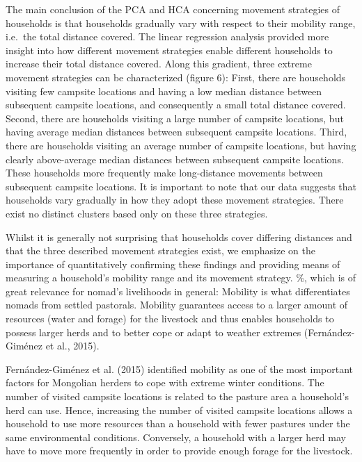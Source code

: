 \documentclass[]{elsarticle} %
\begin{document}
The main conclusion of the PCA and HCA concerning movement strategies of
households is that households gradually vary with respect to their
mobility range, i.e.~the total distance covered. The linear regression
analysis provided more insight into how different movement strategies
enable different households to increase their total distance covered.
Along this gradient, three extreme movement strategies can be
characterized (figure 6): First, there are households visiting few
campsite locations and having a low median distance between subsequent
campsite locations, and consequently a small total distance covered.
Second, there are households visiting a large number of campsite
locations, but having average median distances between subsequent
campsite locations. Third, there are households visiting an average
number of campsite locations, but having clearly above-average median
distances between subsequent campsite locations. These households more
frequently make long-distance movements between subsequent campsite
locations. It is important to note that our data suggests that
households vary gradually in how they adopt these movement strategies.
There exist no distinct clusters based only on these three strategies.

Whilst it is generally not surprising that households cover differing
distances and that the three described movement strategies exist, we
emphasize on the importance of quantitatively confirming these findings
and providing means of measuring a household's mobility range and its
movement strategy. \%, which is of great relevance for nomad's
livelihoods in general: Mobility is what differentiates nomads from
settled pastorals. Mobility guarantees access to a larger amount of
resources (water and forage) for the livestock and thus enables
households to possess larger herds and to better cope or adapt to
weather extremes (Fernández-Giménez et al., 2015).

Fernández-Giménez et al. (2015) identified mobility as one of the most
important factors for Mongolian herders to cope with extreme winter
conditions. The number of visited campsite locations is related to the
pasture area a household's herd can use. Hence, increasing the number of
visited campsite locations allows a household to use more resources than
a household with fewer pastures under the same environmental conditions.
Conversely, a household with a larger herd may have to move more
frequently in order to provide enough forage for the livestock.
\end{document}
